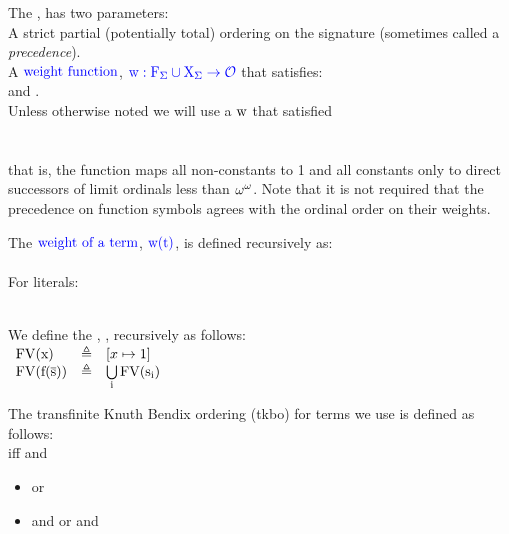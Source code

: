 \noindent
The ,  has two parameters:\\
A strict partial (potentially total) ordering \m{\succ} on the signature  (sometimes called a \emph{precedence}).\\
A $\textcolor{blue}{\mbox{weight function}}$, $\textcolor{blue}{\mathrm{w:F_\Sigma \cup X_\Sigma \rightarrow \mathcal{O}}}$ that satisfies:\\
 and  .\\
Unless otherwise noted we will use a $\mathrm{w}$ that satisfied\\
\\
\\
that is, the function maps all non-constants to 1 and all constants only to direct successors of limit ordinals less than $\mathrm{\omega^\omega}$. 
Note that it is not required that the precedence on function symbols agrees with the ordinal order on their weights.

\noindent
The $\textcolor{blue}{\mbox{weight of a term}}$, $\textcolor{blue}{\mathrm{w(t)}}$, is defined recursively as:\\
\\
For literals:\\
\\

\noindent
We define the  , , recursively as follows:\\
$ 
\begin{array}{lll}
	\mathrm{FV}(\mathrm{x})         & \triangleq & [x \mapsto 1]\\
	\mathrm{FV}(\mathrm{\mathrm{f}(\mathrm{\overline{s}})}) & \triangleq & \bigcup\limits_{\mathrm{i}} \mathrm{FV}(\mathrm{s_i})\\
\end{array} 
$

\bigskip

\noindent
The transfinite Knuth Bendix ordering (tkbo) for terms we use is defined as follows:\\
 iff  and
\begin{itemize}
	\item {} or
	\item {} and
		\subitem {} or
		\subitem {} and 
\end{itemize}

